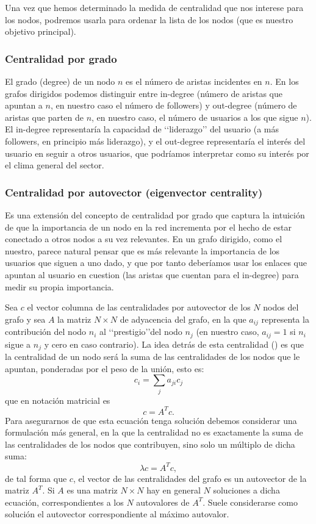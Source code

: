Una vez que hemos determinado la medida de centralidad que nos interese para los nodos,
podremos usarla para ordenar la lista de los nodos (que es nuestro objetivo principal).

\subsubsection{Centralidad por grado}
El grado (degree) de un nodo $n$ es el número de aristas 
incidentes en $n$. En los grafos dirigidos podemos distinguir entre in-degree (número
de aristas que apuntan a $n$, en nuestro caso el número de followers) y
out-degree (número de aristas que parten de $n$, en nuestro caso, el número de
usuarios a los que sigue $n$). El in-degree representaría la capacidad de 
\lq\lq liderazgo\rq\rq
del usuario (a más followers, en principio más liderazgo), y el out-degree 
representaría el interés del usuario en seguir a otros usuarios, que podríamos
interpretar como su interés por el clima general del sector.

\subsubsection{Centralidad por autovector (eigenvector centrality)}
Es una extensión del 
concepto de cen\-tra\-li\-dad por grado que captura la intuición de que la importancia 
de un nodo en la red incrementa por el hecho de estar conectado a otros nodos 
a su vez relevantes. En un grafo dirigido, como el nuestro, parece natural pensar que
es más relevante la importancia de los usuarios que siguen a uno dado,
y que por tanto deberíamos usar los enlaces que apuntan al usuario en cuestion (las 
aristas que cuentan para el in-degree) para medir su propia importancia. 

Sea $c$ el vector columna
de las centralidades por autovector de los $N$ nodos del grafo y sea $A$ la matriz $N\times N$
de adyacencia del grafo, en la que $a_{ij}$ representa la contribución
del nodo $n_i$ al \lq\lq prestigio\rq\rq del nodo $n_j$ (en nuestro caso, $a_{ij} = 1$ si
$n_i$ sigue a $n_j$ y cero en caso contrario). La idea detrás de esta centralidad
(\cite{bonacich2}) es que la centralidad de un nodo será la suma de las centralidades
de los nodos que le apuntan, ponderadas por el peso de la unión, esto es:
$$c_i = \sum_j a_{ji} c_j$$
que en notación matricial es 
$$c = A^Tc.$$
Para asegurarnos de que esta ecuación tenga solución debemos considerar una formulación más general,
en la que la centralidad no es exactamente la suma de las centralidades de los nodos que 
contribuyen, sino solo un múltiplo de dicha suma:
$$\lambda c = A^Tc,$$
de tal forma que $c$, el vector de las centralidades del grafo es un 
autovector de la matriz $A^T$. Si $A$ es una matriz $N\times N$ hay en general $N$ soluciones
a dicha ecuación, correspondientes a los $N$ autovalores de $A^T$. Suele considerarse
como solución el autovector correspondiente al máximo autovalor.
 
